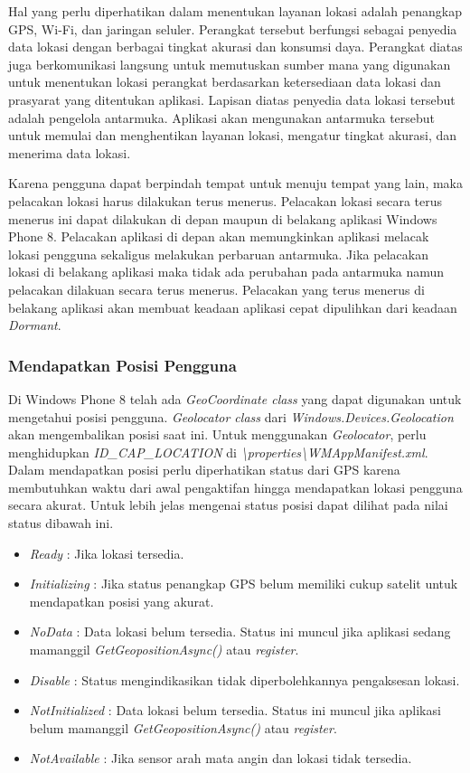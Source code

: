 Hal yang perlu diperhatikan dalam menentukan layanan lokasi adalah penangkap GPS, Wi-Fi, dan jaringan seluler. Perangkat tersebut berfungsi sebagai penyedia data lokasi dengan berbagai tingkat akurasi dan konsumsi daya. Perangkat diatas juga berkomunikasi langsung untuk memutuskan sumber mana yang digunakan untuk menentukan lokasi perangkat berdasarkan ketersediaan data lokasi dan prasyarat yang ditentukan aplikasi. Lapisan diatas penyedia data lokasi tersebut adalah pengelola antarmuka. Aplikasi akan mengunakan antarmuka tersebut untuk memulai dan menghentikan layanan lokasi, mengatur tingkat akurasi, dan menerima data lokasi.

Karena pengguna dapat berpindah tempat untuk menuju tempat yang lain, maka pelacakan lokasi harus dilakukan terus menerus. Pelacakan lokasi secara terus menerus ini dapat dilakukan di depan maupun di belakang aplikasi Windows Phone 8. Pelacakan aplikasi di depan akan memungkinkan aplikasi melacak lokasi pengguna sekaligus melakukan perbaruan antarmuka. Jika pelacakan lokasi di belakang aplikasi maka tidak ada perubahan pada antarmuka namun pelacakan dilakuan secara terus menerus. Pelacakan yang terus menerus di belakang aplikasi akan membuat keadaan aplikasi cepat dipulihkan dari keadaan \textit{Dormant}.

\subsubsection{Mendapatkan Posisi Pengguna}
\label{subsubsec:Mendapatkan Posisi Pengguna}
\hspace{0.5cm} Di Windows Phone 8 telah ada \textit{GeoCoordinate class} yang dapat digunakan untuk mengetahui posisi pengguna. \textit{Geolocator class} dari \textit{Windows.Devices.Geolocation} akan mengembalikan posisi saat ini. Untuk menggunakan \textit{Geolocator}, perlu menghidupkan \textit{ID\_CAP\_LOCATION} di \textit{\textbackslash properties\textbackslash WMAppManifest.xml}. Dalam mendapatkan posisi perlu diperhatikan status dari GPS karena membutuhkan waktu dari awal pengaktifan hingga mendapatkan lokasi pengguna secara akurat. Untuk lebih jelas mengenai status posisi dapat dilihat pada nilai status dibawah ini.

\begin{itemize}
	\item \textit{Ready} : Jika lokasi tersedia.
	\item \textit{Initializing} : Jika status penangkap GPS belum memiliki cukup satelit untuk mendapatkan posisi yang akurat. 
	\item \textit{NoData} : Data lokasi belum tersedia. Status ini muncul jika aplikasi sedang mamanggil \textit{GetGeopositionAsync()} atau \textit{register}.
	\item \textit{Disable} : Status mengindikasikan tidak diperbolehkannya pengaksesan lokasi.
	\item \textit{NotInitialized} : Data lokasi belum tersedia. Status ini muncul jika aplikasi belum mamanggil \textit{GetGeopositionAsync()} atau \textit{register}.
	\item \textit{NotAvailable} : Jika sensor arah mata angin dan lokasi tidak tersedia.
\end{itemize}

